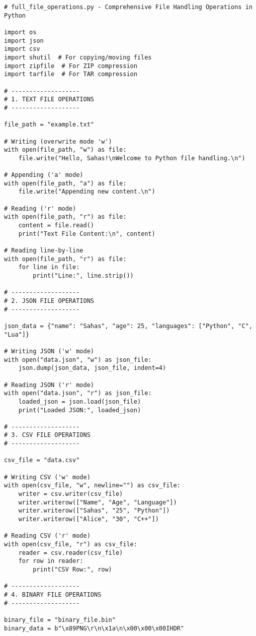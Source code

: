 \begin{verbatim}
# full_file_operations.py - Comprehensive File Handling Operations in Python

import os
import json
import csv
import shutil  # For copying/moving files
import zipfile  # For ZIP compression
import tarfile  # For TAR compression

# -------------------
# 1. TEXT FILE OPERATIONS
# -------------------

file_path = "example.txt"

# Writing (overwrite mode 'w')
with open(file_path, "w") as file:
    file.write("Hello, Sahas!\nWelcome to Python file handling.\n")

# Appending ('a' mode)
with open(file_path, "a") as file:
    file.write("Appending new content.\n")

# Reading ('r' mode)
with open(file_path, "r") as file:
    content = file.read()
    print("Text File Content:\n", content)

# Reading line-by-line
with open(file_path, "r") as file:
    for line in file:
        print("Line:", line.strip())

# -------------------
# 2. JSON FILE OPERATIONS
# -------------------

json_data = {"name": "Sahas", "age": 25, "languages": ["Python", "C", "Lua"]}

# Writing JSON ('w' mode)
with open("data.json", "w") as json_file:
    json.dump(json_data, json_file, indent=4)

# Reading JSON ('r' mode)
with open("data.json", "r") as json_file:
    loaded_json = json.load(json_file)
    print("Loaded JSON:", loaded_json)

# -------------------
# 3. CSV FILE OPERATIONS
# -------------------

csv_file = "data.csv"

# Writing CSV ('w' mode)
with open(csv_file, "w", newline="") as csv_file:
    writer = csv.writer(csv_file)
    writer.writerow(["Name", "Age", "Language"])
    writer.writerow(["Sahas", "25", "Python"])
    writer.writerow(["Alice", "30", "C++"])

# Reading CSV ('r' mode)
with open(csv_file, "r") as csv_file:
    reader = csv.reader(csv_file)
    for row in reader:
        print("CSV Row:", row)

# -------------------
# 4. BINARY FILE OPERATIONS
# -------------------

binary_file = "binary_file.bin"
binary_data = b"\x89PNG\r\n\x1a\n\x00\x00\x00IHDR"


\end{verbatim}
